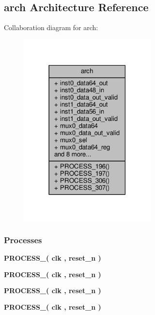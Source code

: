 \subsection{arch Architecture Reference}
\label{classbit__pack_1_1arch}


Collaboration diagram for arch\+:\nopagebreak
\begin{figure}[H]
\begin{center}
\leavevmode
\includegraphics[width=198pt]{df/d98/classbit__pack_1_1arch__coll__graph}
\end{center}
\end{figure}
\subsubsection*{Processes}
 \begin{DoxyCompactItemize}
\item 
{\bf P\+R\+O\+C\+E\+S\+S\+\_}{\bfseries  ( {\bfseries {\bfseries {\bf clk}} \textcolor{vhdlchar}{ }} , {\bfseries {\bfseries {\bf reset\+\_\+n}} \textcolor{vhdlchar}{ }} )}
\item 
{\bf P\+R\+O\+C\+E\+S\+S\+\_}{\bfseries  ( {\bfseries {\bfseries {\bf clk}} \textcolor{vhdlchar}{ }} , {\bfseries {\bfseries {\bf reset\+\_\+n}} \textcolor{vhdlchar}{ }} )}
\item 
{\bf P\+R\+O\+C\+E\+S\+S\+\_}{\bfseries  ( {\bfseries {\bfseries {\bf clk}} \textcolor{vhdlchar}{ }} , {\bfseries {\bfseries {\bf reset\+\_\+n}} \textcolor{vhdlchar}{ }} )}
\item 
{\bf P\+R\+O\+C\+E\+S\+S\+\_}{\bfseries  ( {\bfseries {\bfseries {\bf clk}} \textcolor{vhdlchar}{ }} , {\bfseries {\bfseries {\bf reset\+\_\+n}} \textcolor{vhdlchar}{ }} )}
\end{DoxyCompactItemize}
